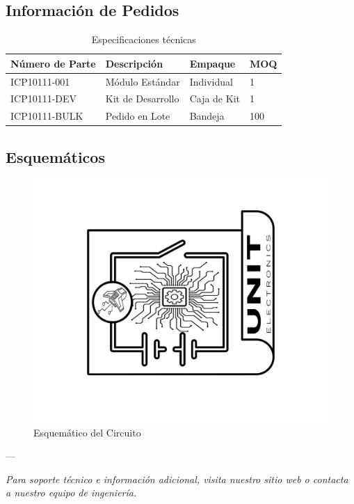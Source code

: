 \documentclass[11pt,a4paper]{article}
\begin{document}
\subsection{Información de Pedidos}


\begin{table}[H]
\centering
\small
\begin{tabular}{|l|l|l|l|}
\hline
Número de Parte & Descripción & Empaque & MOQ \\
\hline
ICP10111-001 & Módulo Estándar & Individual & 1 \\
ICP10111-DEV & Kit de Desarrollo & Caja de Kit & 1 \\
ICP10111-BULK & Pedido en Lote & Bandeja & 100 \\
\hline
\end{tabular}
\caption{Especificaciones técnicas}
\end{table}


\subsection{Esquemáticos}


\begin{figure}[H]
\centering
\includegraphics[width=\textwidth]{es_Schematics_icon.jpg}
\caption{Esquemático del Circuito}
\label{fig:es-Schematics-icon-jpg}
\end{figure}



---

\textit{Para soporte técnico e información adicional, visita nuestro sitio web o contacta a nuestro equipo de ingeniería.}
\end{document}
